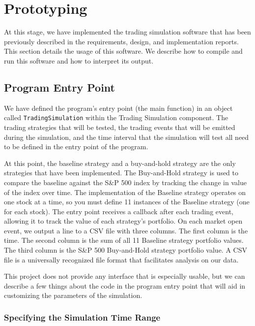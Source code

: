 
\section{Prototyping}\label{prototyping}

At this stage, we have implemented the trading simulation software that has been previously described in the requirements, design, and implementation reports.
This section details the usage of this software.
We describe how to compile and run this software and how to interpret its output.

\subsection{Program Entry Point}

We have defined the program's entry point (the main function) in an object called \texttt{TradingSimulation} within the Trading Simulation component.
The trading strategies that will be tested, the trading events that will be emitted during the simulation, and the time interval that the simulation will test all need to be defined in the entry point of the program.

At this point, the baseline strategy and a buy-and-hold strategy are the only strategies that have been implemented.
The Buy-and-Hold strategy is used to compare the baseline against the S\&P 500 index by tracking the change in value of the index over time.
The implementation of the Baseline strategy operates on one stock at a time, so you must define 11 instances of the Baseline strategy (one for each stock).
The entry point receives a callback after each trading event, allowing it to track the value of each strategy's portfolio.
On each market open event, we output a line to a CSV file with three columns.
The first column is the time.
The second column is the sum of all 11 Baseline strategy portfolio values.
The third column is the S\&P 500 Buy-and-Hold strategy portfolio value.
A CSV file is a universally recognized file format that facilitates analysis on our data.

This project does not provide any interface that is especially usable, but we can describe a few things about the code in the program entry point that will aid in customizing the parameters of the simulation.

\subsubsection{Specifying the Simulation Time Range}

